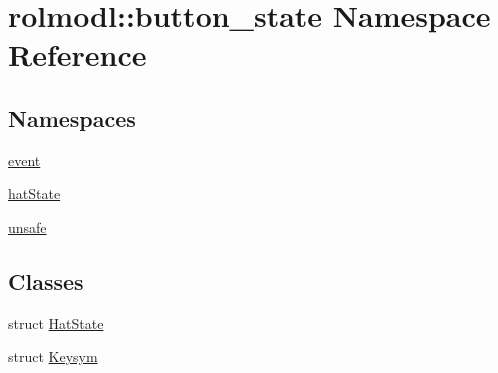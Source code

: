 \hypertarget{namespacerolmodl_1_1button__state}{}\section{rolmodl\+::button\+\_\+state Namespace Reference}
\label{namespacerolmodl_1_1button__state}
\subsection*{Namespaces}
\begin{DoxyCompactItemize}
\item 
 \mbox{\hyperlink{namespacerolmodl_1_1button__state_1_1event}{event}}
\item 
 \mbox{\hyperlink{namespacerolmodl_1_1button__state_1_1hat_state}{hat\+State}}
\item 
 \mbox{\hyperlink{namespacerolmodl_1_1button__state_1_1unsafe}{unsafe}}
\end{DoxyCompactItemize}
\subsection*{Classes}
\begin{DoxyCompactItemize}
\item 
struct \mbox{\hyperlink{structrolmodl_1_1button__state_1_1_hat_state}{Hat\+State}}
\item 
struct \mbox{\hyperlink{structrolmodl_1_1button__state_1_1_keysym}{Keysym}}
\end{DoxyCompactItemize}
